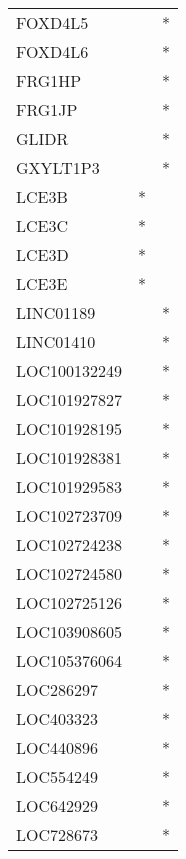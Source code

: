 \begin{tabular}{lcc}
FOXD4L5            &                &          * \\
FOXD4L6            &                &          * \\
FRG1HP             &                &          * \\
FRG1JP             &                &          * \\
GLIDR              &                &          * \\
GXYLT1P3           &                &          * \\
LCE3B              &              * &            \\
LCE3C              &              * &            \\
LCE3D              &              * &            \\
LCE3E              &              * &            \\
LINC01189          &                &          * \\
LINC01410          &                &          * \\
LOC100132249       &                &          * \\
LOC101927827       &                &          * \\
LOC101928195       &                &          * \\
LOC101928381       &                &          * \\
LOC101929583       &                &          * \\
LOC102723709       &                &          * \\
LOC102724238       &                &          * \\
LOC102724580       &                &          * \\
LOC102725126       &                &          * \\
LOC103908605       &                &          * \\
LOC105376064       &                &          * \\
LOC286297          &                &          * \\
LOC403323          &                &          * \\
LOC440896          &                &          * \\
LOC554249          &                &          * \\
LOC642929          &                &          * \\
LOC728673          &                &          * \\

\end{tabular}

